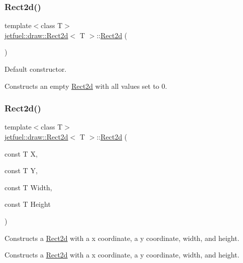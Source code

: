 \subsubsection{\texorpdfstring{Rect2d()}{Rect2d()}\hspace{0.1cm}{\footnotesize\ttfamily [1/3]}}
{\footnotesize\ttfamily template$<$class T$>$ \\
\hyperlink{classjetfuel_1_1draw_1_1Rect2d}{jetfuel\+::draw\+::\+Rect2d}$<$ T $>$\+::\hyperlink{classjetfuel_1_1draw_1_1Rect2d}{Rect2d} (\begin{DoxyParamCaption}{ }\end{DoxyParamCaption})\hspace{0.3cm}{\ttfamily [inline]}}



Default constructor. 

Constructs an empty \hyperlink{classjetfuel_1_1draw_1_1Rect2d}{Rect2d} with all values set to 0. \mbox{\label{classjetfuel_1_1draw_1_1Rect2d_aeab9db448df3318ab83fe19f3844f498}} 
\subsubsection{\texorpdfstring{Rect2d()}{Rect2d()}\hspace{0.1cm}{\footnotesize\ttfamily [2/3]}}
{\footnotesize\ttfamily template$<$class T$>$ \\
\hyperlink{classjetfuel_1_1draw_1_1Rect2d}{jetfuel\+::draw\+::\+Rect2d}$<$ T $>$\+::\hyperlink{classjetfuel_1_1draw_1_1Rect2d}{Rect2d} (\begin{DoxyParamCaption}\item[{const T}]{X,  }\item[{const T}]{Y,  }\item[{const T}]{Width,  }\item[{const T}]{Height }\end{DoxyParamCaption})\hspace{0.3cm}{\ttfamily [inline]}}



Constructs a \hyperlink{classjetfuel_1_1draw_1_1Rect2d}{Rect2d} with a x coordinate, a y coordinate, width, and height. 

Constructs a \hyperlink{classjetfuel_1_1draw_1_1Rect2d}{Rect2d} with a x coordinate, a y coordinate, width, and height.


